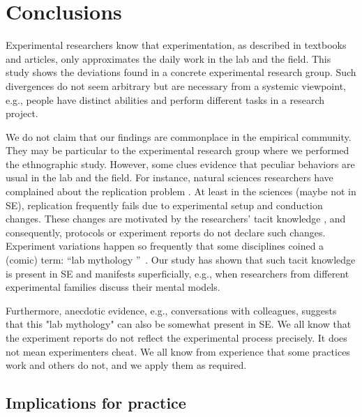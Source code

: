 \section{Conclusions}\label{sec-conclusions}
Experimental researchers know that experimentation, as described in textbooks and articles, only approximates the daily work in the lab and the field. This study shows the deviations found in a concrete experimental research group. Such divergences do not seem arbitrary but are necessary from a systemic viewpoint, e.g., people have distinct abilities and perform different tasks in a research project.

We do not claim that our findings are commonplace in the empirical community. They may be particular to the experimental research group where we performed the ethnographic study. However, some clues evidence that peculiar behaviors are usual in the lab and the field. For instance, natural sciences researchers have complained about the replication problem \cite{hines2014sorting}. At least in the sciences (maybe not in SE), replication frequently fails due to experimental setup and conduction changes. These changes are motivated by the researchers' tacit knowledge \cite{Polanyi-1996-tacit-k,Shull-2002-replicating-SE-experiments-tacit-k}, and consequently, protocols or experiment reports do not declare such changes. Experiment variations happen so frequently that some disciplines coined a (comic) term: \textquotedblleft lab mythology \textquotedblright~\cite{ruben2011experimental,loukides2015beyond}. Our study has shown that such tacit knowledge is present in SE and manifests superficially, e.g., when researchers from different experimental families discuss their mental models.

Furthermore, anecdotic evidence, e.g., conversations with colleagues, suggests that this "lab mythology" can also be somewhat present in SE. We all know that the experiment reports do not reflect the experimental process precisely. It does not mean experimenters cheat. We all know from experience that some practices work and others do not, and we apply them as required.

\subsection{Implications for practice}



